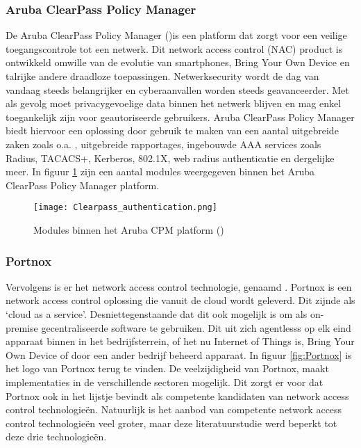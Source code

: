 \subsubsection{\bf Aruba ClearPass Policy Manager}
De Aruba ClearPass Policy Manager (\cite{ArubaCPPM})is een platform dat zorgt voor een veilige toegangscontrole tot een netwerk. Dit network access control (NAC) product is ontwikkeld omwille van de evolutie van smartphones, Bring Your Own Device en talrijke andere draadloze toepassingen. 
\newline
\newline
Netwerksecurity wordt de dag van vandaag steeds belangrijker en cyberaanvallen worden steeds geavanceerder. Met als gevolg moet privacygevoelige data binnen het netwerk blijven en mag enkel toegankelijk zijn voor geautoriseerde gebruikers. Aruba ClearPass Policy Manager biedt hiervoor een oplossing door gebruik te maken van een aantal uitgebreide zaken zoals o.a. , uitgebreide rapportages, ingebouwde AAA services zoals Radius, TACACS+, Kerberos, 802.1X, web radius authenticatie en dergelijke meer. In figuur \ref{fig:ArubaClearPass} zijn een aantal modules weergegeven binnen het Aruba ClearPass Policy Manager platform. 

\begin{figure}[H]
	\centering
	\texttt{[image: Clearpass\_authentication.png]}
	\caption{Modules binnen het Aruba CPM platform (\cite{ACPMModule})}
	\label{fig:ArubaClearPass}
\end{figure}

\subsubsection{\bf Portnox}
Vervolgens is er het network access control technologie, genaamd \cite{Portnox}. Portnox is een network access control oplossing die vanuit de cloud wordt geleverd. Dit zijnde als ‘cloud as a service’. Desniettegenstaande dat dit ook mogelijk is om als on-premise gecentraliseerde software te gebruiken. Dit uit zich agentlesss op elk eind apparaat binnen in het bedrijfsterrein, of het nu Internet of Things is, Bring Your Own Device of door een ander bedrijf beheerd apparaat. In figuur \ref{fig:Portnox} is het logo van Portnox terug te vinden.
\newline
\newline
De veelzijdigheid van Portnox, maakt implementaties in de verschillende sectoren mogelijk. Dit zorgt er voor dat Portnox ook in het lijstje bevindt als competente kandidaten van network access control technologieën. Natuurlijk is het aanbod van competente network access control technologieën veel groter, maar deze literatuurstudie werd beperkt tot deze drie technologieën. 

